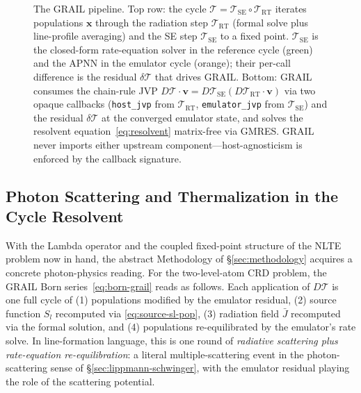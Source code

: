 \documentclass[11pt]{article}
\newcommand{\Tcyc}{\mathcal{T}}
\newcommand{\Trt}{\Tcyc_{\mathrm{RT}}}
\newcommand{\Tse}{\Tcyc_{\mathrm{SE}}}
\newcommand{\dT}{\delta\Tcyc}
\newcommand{\code}[1]{\texttt{#1}}
\begin{document}
\begin{figure}[ht]
\caption{The GRAIL pipeline.  Top row: the cycle
$\Tcyc = \Tse \circ \Trt$ iterates populations $\mathbf{x}$ through the
radiation step $\Trt$ (formal solve plus line-profile averaging) and
the SE step $\Tse$ to a fixed point.  $\Tse$ is the closed-form
rate-equation solver in the reference cycle (green) and the APNN in the
emulator cycle (orange); their per-call difference is the residual
$\dT$ that drives GRAIL.  Bottom: GRAIL consumes the chain-rule JVP
$D\Tcyc \cdot \mathbf{v} = D\Tse(D\Trt \cdot \mathbf{v})$ via two
opaque callbacks (\code{host\_jvp} from $\Trt$, \code{emulator\_jvp}
from $\Tse$) and the residual $\dT$ at the converged emulator state,
and solves the resolvent equation~\eqref{eq:resolvent} matrix-free via
GMRES.  GRAIL never imports either upstream component---host-agnosticism
is enforced by the callback signature.}
\label{fig:pipeline}
\end{figure}

\subsection{Photon Scattering and Thermalization in the Cycle Resolvent}
\label{sec:nlte-photon-scattering}

With the Lambda operator and the coupled fixed-point structure of the
NLTE problem now in hand, the abstract Methodology of
\S\ref{sec:methodology} acquires a concrete photon-physics reading.
For the two-level-atom CRD problem, the GRAIL Born
series~\eqref{eq:born-grail} reads as follows.  Each application of
$D\Tcyc$ is one full cycle of (1) populations modified by the
emulator residual, (2) source function $S_l$ recomputed via
\eqref{eq:source-sl-pop}, (3) radiation field $\bar{J}$ recomputed via
the formal solution, and (4) populations re-equilibrated by the
emulator's rate solve.  In line-formation language, this is one round
of \emph{radiative scattering plus rate-equation re-equilibration}: a
literal multiple-scattering event in the photon-scattering sense of
\S\ref{sec:lippmann-schwinger}, with the emulator residual playing the
role of the scattering potential.
\end{document}
